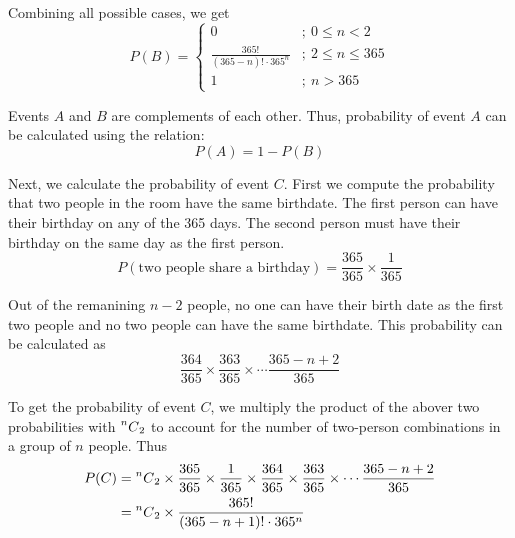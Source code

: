 \documentclass{article}
\begin{document}
\noindent Combining all possible cases, we get
\begin{equation*}
    P(B) = \begin{cases}
        0 & ; ~ 0 \leq n < 2 \\
        \frac{365!}{(365 - n)! \cdot 365^{n}} & ; ~ 2 \leq n \leq 365 \\
        1 & ; ~ n > 365
    \end{cases}
\end{equation*}

\noindent Events $A$ and $B$ are complements of each other. Thus, probability of event $A$ can be calculated using the relation:
$$ P(A) = 1 - P(B) $$

\noindent Next, we calculate the probability of event $C$. First we compute the probability that two people in the room have the same birthdate. The first person can have their birthday on any of the 365 days. The second person must have their birthday on the same day as the first person.
$$ P(\text{two people share a birthday}) = \frac{365}{365} \times \frac{1}{365}$$

\noindent Out of the remanining $n - 2$ people, no one can have their birth date as the first two people and no two people can have the same birthdate. This probability can be calculated as
$$\frac{364}{365} \times \frac{363}{365} \times \cdots \frac{365 - n + 2}{365}$$

\noindent To get the probability of event $C$, we multiply the product of the abover two probabilities with $\prescript{n}{}{C}_{2}$ to account for the number of two-person combinations in a group of $n$ people. Thus
\begin{align*}
    P(C) & = \prescript{n}{}{C}_{2} \times \frac{365}{365} \times \frac{1}{365} \times \frac{364}{365} \times \frac{363}{365} \times \cdots \frac{365 - n + 2}{365} \\
         & = \prescript{n}{}{C}_{2} \times \frac{365!}{(365 - n + 1)! \cdot 365^{n}}
\end{align*}
\end{document}
